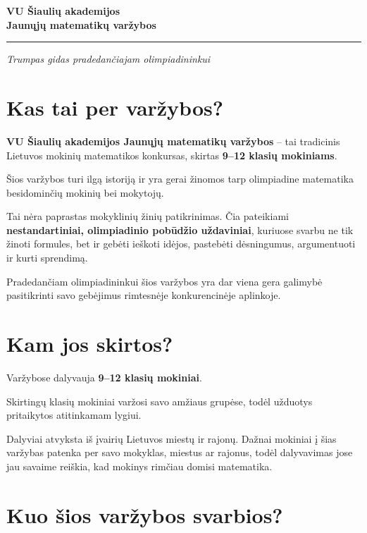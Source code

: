 \documentclass[11pt,a4paper]{article}
\begin{document}
\begin{center}
  {\LARGE\bfseries\color{titleblue} VU Šiaulių akademijos\\[2pt]
  Jaunųjų matematikų varžybos}\par
  \vspace{0.35em}
  {\color{ruleblue}\rule{0.92\textwidth}{0.8pt}}\par
  \vspace{0.45em}
  {\itshape Trumpas gidas pradedančiajam olimpiadininkui}
\end{center}

\section{Kas tai per varžybos?}

\textbf{VU Šiaulių akademijos Jaunųjų matematikų varžybos} -- tai tradicinis Lietuvos mokinių matematikos konkursas, skirtas \textbf{9--12 klasių mokiniams}.

Šios varžybos turi ilgą istoriją ir yra gerai žinomos tarp olimpiadine matematika besidominčių mokinių bei mokytojų.

Tai nėra paprastas mokyklinių žinių patikrinimas. Čia pateikiami \textbf{nestandartiniai, olimpiadinio pobūdžio uždaviniai}, kuriuose svarbu ne tik žinoti formules, bet ir gebėti ieškoti idėjos, pastebėti dėsningumus, argumentuoti ir kurti sprendimą.

Pradedančiam olimpiadininkui šios varžybos yra dar viena gera galimybė pasitikrinti savo gebėjimus rimtesnėje konkurencinėje aplinkoje.

\section{Kam jos skirtos?}

Varžybose dalyvauja \textbf{9--12 klasių mokiniai}.

Skirtingų klasių mokiniai varžosi savo amžiaus grupėse, todėl užduotys pritaikytos atitinkamam lygiui.

Dalyviai atvyksta iš įvairių Lietuvos miestų ir rajonų. Dažnai mokiniai į šias varžybas patenka per savo mokyklas, miestus ar rajonus, todėl dalyvavimas jose jau savaime reiškia, kad mokinys rimčiau domisi matematika.

\section{Kuo šios varžybos svarbios?}
\end{document}
